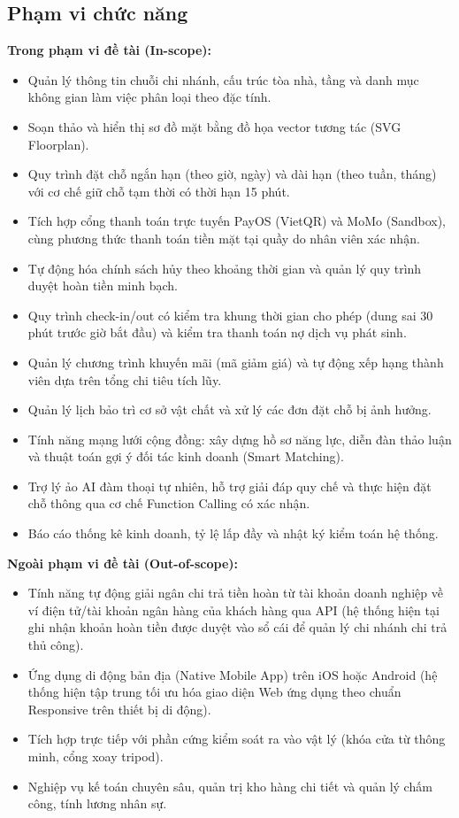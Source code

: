 \subsection{Phạm vi chức năng}
\textbf{Trong phạm vi đề tài (In-scope):}
\begin{itemize}
    \item Quản lý thông tin chuỗi chi nhánh, cấu trúc tòa nhà, tầng và danh mục không gian làm việc phân loại theo đặc tính.
    \item Soạn thảo và hiển thị sơ đồ mặt bằng đồ họa vector tương tác (SVG Floorplan).
    \item Quy trình đặt chỗ ngắn hạn (theo giờ, ngày) và dài hạn (theo tuần, tháng) với cơ chế giữ chỗ tạm thời có thời hạn 15 phút.
    \item Tích hợp cổng thanh toán trực tuyến PayOS (VietQR) và MoMo (Sandbox), cùng phương thức thanh toán tiền mặt tại quầy do nhân viên xác nhận.
    \item Tự động hóa chính sách hủy theo khoảng thời gian và quản lý quy trình duyệt hoàn tiền minh bạch.
    \item Quy trình check-in/out có kiểm tra khung thời gian cho phép (dung sai 30 phút trước giờ bắt đầu) và kiểm tra thanh toán nợ dịch vụ phát sinh.
    \item Quản lý chương trình khuyến mãi (mã giảm giá) và tự động xếp hạng thành viên dựa trên tổng chi tiêu tích lũy.
    \item Quản lý lịch bảo trì cơ sở vật chất và xử lý các đơn đặt chỗ bị ảnh hưởng.
    \item Tính năng mạng lưới cộng đồng: xây dựng hồ sơ năng lực, diễn đàn thảo luận và thuật toán gợi ý đối tác kinh doanh (Smart Matching).
    \item Trợ lý ảo AI đàm thoại tự nhiên, hỗ trợ giải đáp quy chế và thực hiện đặt chỗ thông qua cơ chế Function Calling có xác nhận.
    \item Báo cáo thống kê kinh doanh, tỷ lệ lấp đầy và nhật ký kiểm toán hệ thống.
\end{itemize}

\textbf{Ngoài phạm vi đề tài (Out-of-scope):}
\begin{itemize}
    \item Tính năng tự động giải ngân chi trả tiền hoàn từ tài khoản doanh nghiệp về ví điện tử/tài khoản ngân hàng của khách hàng qua API (hệ thống hiện tại ghi nhận khoản hoàn tiền được duyệt vào sổ cái để quản lý chi nhánh chi trả thủ công).
    \item Ứng dụng di động bản địa (Native Mobile App) trên iOS hoặc Android (hệ thống hiện tập trung tối ưu hóa giao diện Web ứng dụng theo chuẩn Responsive trên thiết bị di động).
    \item Tích hợp trực tiếp với phần cứng kiểm soát ra vào vật lý (khóa cửa từ thông minh, cổng xoay tripod).
    \item Nghiệp vụ kế toán chuyên sâu, quản trị kho hàng chi tiết và quản lý chấm công, tính lương nhân sự.
\end{itemize}

